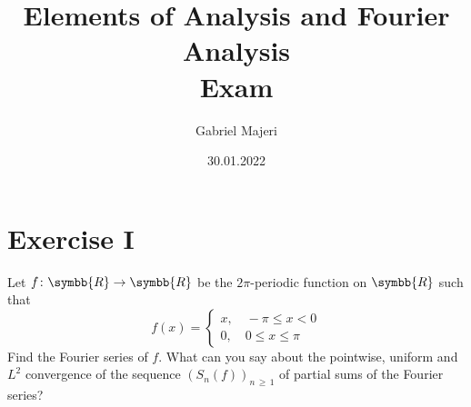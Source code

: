 \documentclass[a4paper, 12pt]{article}
\title{Elements of Analysis and Fourier Analysis \\[0.5em] Exam}
\author{Gabriel Majeri}
\date{30.01.2022}
\newcommand*{\reals}{\symbb{R}}
\begin{document}
\maketitle

\section*{Exercise I}

Let \(f \colon \reals \to \reals\) be the \(2 \pi\)-periodic function on \(\reals\) such that
\[
    f(x) = \begin{cases}
        x, \quad - \pi \leq x < 0 \\[0.5em]
        0, \quad 0 \leq x \leq \pi
    \end{cases}
\]
Find the Fourier series of \(f\). What can you say about the pointwise, uniform and \(L^2\) convergence of the sequence \(\left(S_n(f)\right)_{n \, \geq \, 1}\) of partial sums of the Fourier series?
\end{document}
